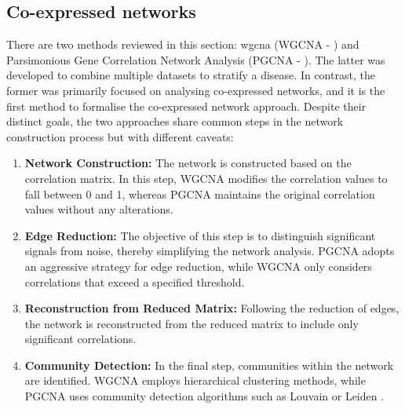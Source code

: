 \subsection{Co-expressed networks} \label{s:lit:co_net}

\vspace{3mm}
\vspace{3mm}

There are two methods reviewed in this section: \acrlong{wgcna} (WGCNA - \citet{Langfelder2008-sn}) and Parsimonious Gene Correlation Network Analysis (PGCNA - \citet{Care2019-ij}). The latter was developed to combine multiple datasets to stratify a disease. In contrast, the former was primarily focused on analysing co-expressed networks, and it is the first method to formalise the co-expressed network approach. Despite their distinct goals, the two approaches share common steps in the network construction process but with different caveats:

\begin{enumerate}
    \item \textbf{Network Construction:} The network is constructed based on the correlation matrix. In this step, WGCNA modifies the correlation values to fall between 0 and 1, whereas PGCNA maintains the original correlation values without any alterations.
    
    \item \textbf{Edge Reduction:} The objective of this step is to distinguish significant signals from noise, thereby simplifying the network analysis. PGCNA adopts an aggressive strategy for edge reduction, while WGCNA only considers correlations that exceed a specified threshold.
    
    \item \textbf{Reconstruction from Reduced Matrix:} Following the reduction of edges, the network is reconstructed from the reduced matrix to include only significant correlations.
    
    \item \textbf{Community Detection:} In the final step, communities within the network are identified. WGCNA employs hierarchical clustering methods, while PGCNA uses community detection algorithms such as Louvain \citep{Blondel2008-ik} or Leiden \citep{Traag2019-ne}.
\end{enumerate}

